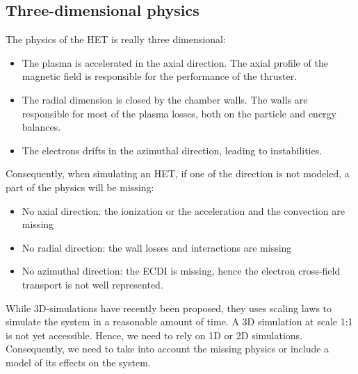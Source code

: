 \subsection{Three-dimensional physics}
\label{sec-3Dphi}

The physics of the \ac{HET} is really three dimensional\string:

\begin{itemize}
  \item The plasma is accelerated in the axial direction. The axial profile of the magnetic field is responsible for the performance of the thruster.
  \item The radial dimension is closed by the chamber walls. The walls are responsible for most of the plasma losses, both on the particle and energy balances.
  \item The electrons drifts in the azimuthal direction, leading to instabilities.
\end{itemize}

Consequently, when simulating an \ac{HET}, if one of the direction is not modeled, a part of the physics will be missing\string:
\begin{itemize}
  \item No axial direction\string: the ionization or the acceleration and the convection are missing
  \item No radial direction\string: the wall losses and interactions are missing
  \item No azimuthal direction\string: the \ac{ECDI} is missing, hence the electron cross-field transport is not well represented.
\end{itemize}

While \ac{3D}-simulations have recently been proposed, they uses scaling laws to simulate the system in a reasonable amount of time.
A \ac{3D} simulation at scale {1\string:1} is not yet accessible.
Hence, we need to rely on \ac{1D} or \ac{2D} simulations.
Consequently, we need to take into account the missing physics or include a model of its effects on the system.
